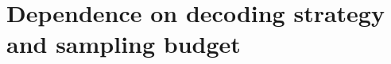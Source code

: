 \documentclass[11pt,a4paper]{article}
\newcommand{\TBD}[1]{\textcolor{red!70!black}{\textsf{[TBD: #1]}}}
\newcommand{\sechead}[2]{\section{#2}}
\newcommand{\subhead}[1]{\subsection*{#1}}
\begin{document}





\sechead{S7}{Dependence on decoding strategy and sampling budget}
\label{supp:decoding_budget}
\end{document}
